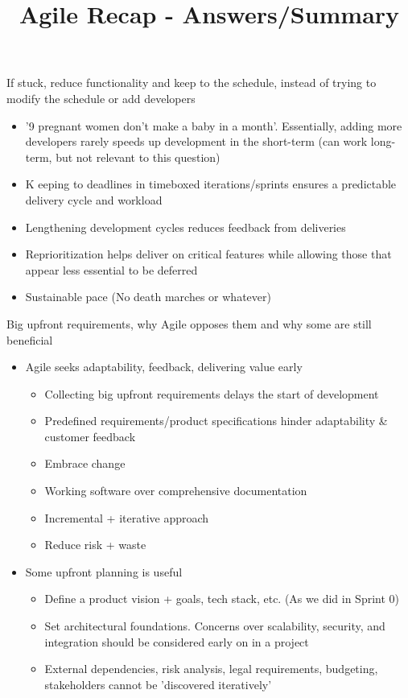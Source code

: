 \documentclass[10pt]{article}
\title{Agile Recap - Answers/Summary}
\date{}
\author{}
\begin{document}
\maketitle
If stuck, reduce functionality and keep to the schedule, instead of trying to modify the schedule or add developers
\begin{itemize}
\item '9 pregnant women don't make a baby in a month'. Essentially, adding more developers rarely speeds up development in the short-term (can work long-term, but not relevant to this question)
\item K eeping to deadlines in timeboxed iterations/sprints ensures a predictable delivery cycle and workload
\item Lengthening development cycles reduces feedback from deliveries
\item Reprioritization helps deliver on critical features while allowing those that appear less essential to be deferred
\item Sustainable pace (No death marches or whatever)
\end{itemize}
Big upfront requirements, why Agile opposes them and why some are still beneficial
\begin{itemize}
\item Agile seeks adaptability, feedback, delivering value early
\begin{itemize}
\item Collecting big upfront requirements delays the start of development
\item Predefined requirements/product specifications hinder adaptability \& customer feedback
\item Embrace change
\item Working software over comprehensive documentation
\item Incremental + iterative approach
\item Reduce risk + waste
\end{itemize}
\item Some upfront planning is useful
\begin{itemize}
\item Define a product vision + goals, tech stack, etc. (As we did in Sprint 0)
\item Set architectural foundations. Concerns over scalability, security, and integration should be considered early on in a project
\item External dependencies, risk analysis, legal requirements, budgeting, stakeholders cannot be 'discovered iteratively'
\end{itemize}
\end{itemize}
\end{document}
